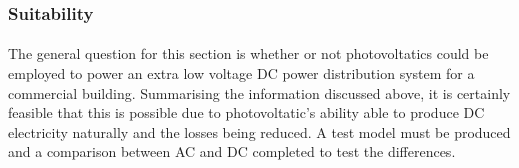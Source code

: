 
\subsubsection{Suitability}

\paragraph{}
The general question for this section is whether or not photovoltatics could be employed to power an extra low voltage DC power distribution system for a commercial building. Summarising the information discussed above, it is certainly feasible that this is possible due to photovoltatic's ability able to produce DC electricity naturally and the losses being reduced. A test model must be produced and a comparison between AC and DC completed to test the differences.  
